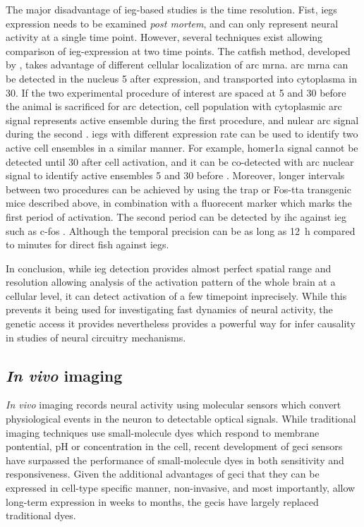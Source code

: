 The major disadvantage of \gls{ieg}-based studies is the time resolution. Fist, \glspl{ieg} expression needs to be examined \textit{post mortem}, and can only represent neural activity at a single time point. However, several techniques exist allowing comparison of \gls{ieg}-expression at two time points. The \gls{catfish} method, developed by \citet{guzowski99}, takes advantage of different cellular localization of \gls{arc} \gls{mrna}. \Gls{arc} \gls{mrna} can be detected in the nucleus \SI{5}{\min} after expression, and transported into cytoplasma in \SI{30}{\min}. If the two experimental procedure of interest are spaced at \SI{5}{\min} and \SI{30}{\min} before the animal is sacrificed for \gls{arc} detection, cell population with cytoplasmic \gls{arc} signal represents active ensemble during the first procedure, and nulear \gls{arc} signal during the second \citep{guzowski99}. \Glspl{ieg} with different expression rate can be used to identify two active cell ensembles in a similar manner. For example, homer1a signal cannot be detected until \SI{30}{\min} after cell activation, and it can be co-detected with \gls{arc} nuclear signal to identify active ensembles \SI{5}{\min} and \SI{30}{\min} before \citep{vazdarjanova04}. Moreover, longer intervals between two procedures can be achieved by using the \gls{trap} or Fos-\gls{tta} transgenic mice described above, in combination with a fluorecent marker which marks the first period of activation. The second period can be detected by \gls{ihc} against \gls{ieg} such as c-fos \citep{reijmers07, guenthner13}. Although the temporal precision can be as long as \SI{12}{\hour} compared to minutes for direct \gls{fish} against \glspl{ieg}.

In conclusion, while \gls{ieg} detection provides almost perfect spatial range and resolution allowing analysis of the activation pattern of the whole brain at a cellular level, it can detect activation of a few timepoint inprecisely. While this prevents it being used for investigating fast dynamics of neural activity, the genetic access it provides nevertheless provides a powerful way for infer causality in studies of neural circuitry mechanisms.


\subsection{\textit{In vivo} imaging}

\textit{In vivo} imaging records neural activity using molecular sensors which convert physiological events in the neuron to detectable optical signals. While traditional imaging techniques use small-molecule dyes which respond to membrane pontential, pH or  concentration in the cell, recent development of \gls{geci}  sensors have surpassed the performance of small-molecule  dyes in both sensitivity and responsiveness. Given the additional advantages of \gls{geci} that they can be expressed in cell-type specific manner, non-invasive, and most importantly, allow long-term expression in weeks to months, the \glspl{geci} have largely replaced traditional dyes. 

